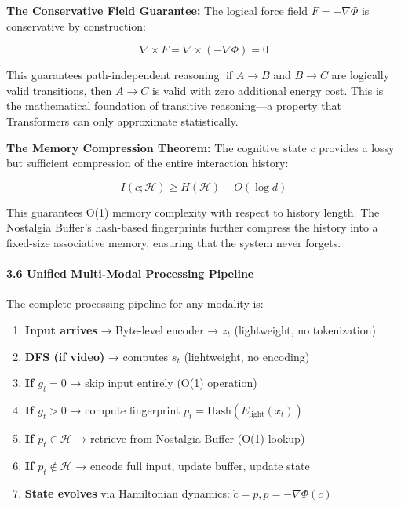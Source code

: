 \documentclass[
  11pt,
  a4paper,
]{article}
\providecommand{\tightlist}{%
  \setlength{\itemsep}{0pt}\setlength{\parskip}{0pt}}
\begin{document}
\textbf{The Conservative Field Guarantee:} The logical force field
\(F = -\nabla\Phi\) is conservative by construction:

\[
\nabla \times F = \nabla \times (-\nabla\Phi) = 0
\]

This guarantees path-independent reasoning: if \(A \to B\) and
\(B \to C\) are logically valid transitions, then \(A \to C\) is valid
with zero additional energy cost. This is the mathematical foundation of
transitive reasoning---a property that Transformers can only approximate
statistically.

\textbf{The Memory Compression Theorem:} The cognitive state \(c\)
provides a lossy but sufficient compression of the entire interaction
history:

\[
I(c; \mathcal{H}) \geq H(\mathcal{H}) - O(\log d)
\]

This guarantees O(1) memory complexity with respect to history length.
The Nostalgia Buffer's hash-based fingerprints further compress the
history into a fixed-size associative memory, ensuring that the system
never forgets.

\paragraph{3.6 Unified Multi-Modal Processing
Pipeline}\label{unified-multi-modal-processing-pipeline}

The complete processing pipeline for any modality is:

\begin{enumerate}
\def\labelenumi{\arabic{enumi}.}
\tightlist
\item
  \textbf{Input arrives} → Byte-level encoder → \(z_t\) (lightweight, no
  tokenization)
\item
  \textbf{DFS (if video)} → computes \(s_t\) (lightweight, no encoding)
\item
  \textbf{If \(g_t = 0\)} → skip input entirely (O(1) operation)
\item
  \textbf{If \(g_t > 0\)} → compute fingerprint
  \(p_t = \text{Hash}(E_{\text{light}}(x_t))\)
\item
  \textbf{If \(p_t \in \mathcal{H}\)} → retrieve from Nostalgia Buffer
  (O(1) lookup)
\item
  \textbf{If \(p_t \notin \mathcal{H}\)} → encode full input, update
  buffer, update state
\item
  \textbf{State evolves} via Hamiltonian dynamics:
  \(\dot{c} = p, \dot{p} = -\nabla\Phi(c)\)
\end{enumerate}
\end{document}
